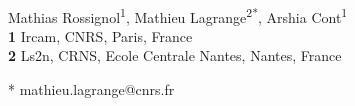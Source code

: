 \documentclass[10pt,letterpaper]{article}
\begin{document}
\vspace*{0.2in}

\begin{flushleft}
{\Large
\textbf{} %
}
\newline
\\
Mathias Rossignol\textsuperscript{1},
Mathieu Lagrange\textsuperscript{2*},
Arshia Cont\textsuperscript{1} %
\\
\bigskip
\textbf{1} Ircam, CNRS, Paris, France
\\
\textbf{2} Ls2n, CRNS, Ecole Centrale Nantes, Nantes, France
\\
\bigskip

%
%




* mathieu.lagrange@cnrs.fr
\end{flushleft}
\end{document}
